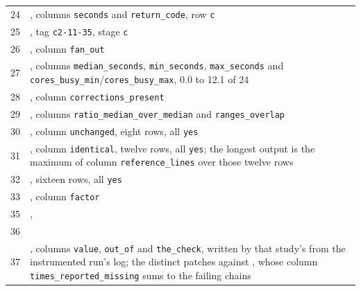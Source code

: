 \begin{xltabular}{\textwidth}{rX}
24 & \protect{}, columns \texttt{seconds} and
\texttt{return\_\allowbreak{}\allowbreak{}code}, row \texttt{c} \\
25 & \protect{}, tag \texttt{c2-\allowbreak{}11-\allowbreak{}35}, stage \texttt{c} \\
26 & \protect{}, column \texttt{fan\_\allowbreak{}\allowbreak{}out} \\
27 & \protect{}, columns \texttt{median\_\allowbreak{}\allowbreak{}seconds}, \texttt{min\_\allowbreak{}\allowbreak{}seconds},
\texttt{max\_\allowbreak{}\allowbreak{}seconds} and \texttt{cores\_\allowbreak{}\allowbreak{}busy\_\allowbreak{}\allowbreak{}min}/\texttt{cores\_\allowbreak{}\allowbreak{}busy\_\allowbreak{}\allowbreak{}max}, 0.0 to 12.1 of 24 \\
28 & \protect{}, column \texttt{corrections\_\allowbreak{}\allowbreak{}present} \\
29 & \protect{}, columns \texttt{ratio\_\allowbreak{}\allowbreak{}median\_\allowbreak{}\allowbreak{}over\_\allowbreak{}\allowbreak{}median} and
\texttt{ranges\_\allowbreak{}\allowbreak{}overlap} \\
30 & \protect{}, column \texttt{unchanged}, eight rows, all \texttt{yes} \\
31 & \protect{}, column \texttt{identical},
twelve rows, all \texttt{yes}; the longest output is the maximum of column \texttt{reference\_\allowbreak{}lines} over those twelve rows \\
32 & \protect{}, sixteen rows, all \texttt{yes} \\
33 & \protect{}, column \texttt{factor} \\
35 & \protect{}, \protect{} \\
36 & \protect{} \\
37 & \protect{}, columns \texttt{value}, \texttt{out\_\allowbreak{}\allowbreak{}of} and \texttt{the\_\allowbreak{}\allowbreak{}check},
written by that study's \protect{} from the instrumented run's log; the distinct patches against \protect{}, whose column \texttt{times\_\allowbreak{}reported\_\allowbreak{}missing} sums to the failing chains \\

\end{xltabular}
